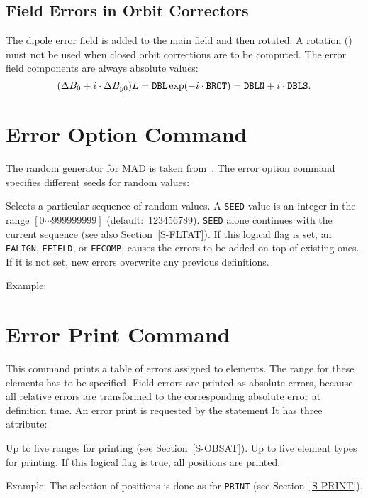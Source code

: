 \subsection{Field Errors in Orbit Correctors}
The dipole error field is added to the main field and then rotated.
A rotation () must not be used when closed orbit corrections
are to be computed.
The error field components are always absolute values:
\[
(\Delta B_{0}+i\cdot\Delta B_{y0})L=\hbox{\tt DBL}\exp(-i\cdot\hbox{\tt BROT})=
\hbox{\tt DBLN}+i\cdot\hbox{\tt DBLS}.
\]
 
\section{Error Option Command}
\label{S-EOPTCOM}
The random generator for MAD is taken from~\cite{B-KNUTH}.
The error option command specifies different seeds for random values:
\begin{mylist}
Selects a particular sequence of random values.
A {\tt SEED} value is an integer in the range \([0 \cdots 999999999]\)
(default:~123456789).
{\tt SEED} alone continues with the current sequence
(see also Section~\ref{S-FLTAT}).
If this logical flag is set,
an {\tt EALIGN}, {\tt EFIELD}, or {\tt EFCOMP}, causes the errors to
be added on top of existing ones.
If it is not set,
new errors overwrite any previous definitions.
\end{mylist}
Example:
 
\section{Error Print Command}
\label{S-EPRICOM}
This command prints a table of errors assigned to elements.
The range for these elements has to be specified.
Field errors are printed as absolute errors,
because all relative errors are transformed to the corresponding
absolute error at definition time.
An error print is requested by the  statement
It has three attribute:
\begin{mylist}
Up to five ranges for printing (see Section~\ref{S-OBSAT}).
Up to five element types for printing.
If this logical flag is true, all positions are printed.
\end{mylist}
Example:
The selection of positions is done as for {\tt PRINT}
(see Section~\ref{S-PRINT}).

